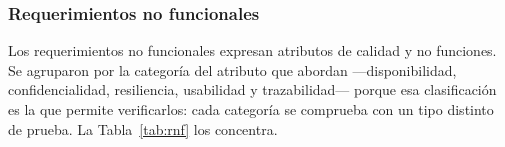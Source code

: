 	\normalsize
	\setlength{\tabcolsep}{6pt}
	\renewcommand{\arraystretch}{1}
	
	\subsubsection{Requerimientos no funcionales}
	Los requerimientos no funcionales expresan atributos de calidad y no funciones. Se agruparon
	por la categoría del atributo que abordan ---disponibilidad, confidencialidad, resiliencia,
	usabilidad y trazabilidad--- porque esa clasificación es la que permite verificarlos: cada
	categoría se comprueba con un tipo distinto de prueba. La Tabla~\ref{tab:rnf} los concentra.
	
	
	\small
	\renewcommand{\arraystretch}{1.2}
	\setlength{\tabcolsep}{4pt}
	
